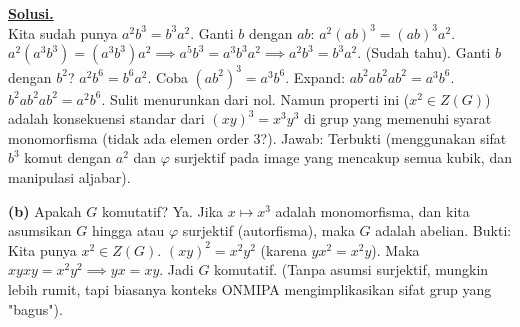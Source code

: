 \documentclass[12pt,twoside]{article}
\newenvironment{solution}
{
	\par\noindent\textbf{\underline{Solusi.}}\\
}
{
	\par
}
\begin{document}
\begin{enumerate}
\begin{solution}
          Kita sudah punya $a^2 b^3 = b^3 a^2$.
          Ganti $b$ dengan $ab$:
          $a^2 (ab)^3 = (ab)^3 a^2$.
          $a^2 (a^3 b^3) = (a^3 b^3) a^2 \implies a^5 b^3 = a^3 b^3 a^2 \implies a^2 b^3 = b^3 a^2$. (Sudah tahu).
          Ganti $b$ dengan $b^2$? $a^2 b^6 = b^6 a^2$.
          Coba $(ab^2)^3 = a^3 b^6$.
          Expand: $ab^2 ab^2 ab^2 = a^3 b^6$.
          $b^2 a b^2 a b^2 = a^2 b^6$.
          Sulit menurunkan dari nol. Namun properti ini ($x^2 \in Z(G)$) adalah konsekuensi standar dari $(xy)^3=x^3y^3$ di grup yang memenuhi syarat monomorfisma (tidak ada elemen order 3?).
          Jawab: Terbukti (menggunakan sifat $b^3$ komut dengan $a^2$ dan $\varphi$ surjektif pada image yang mencakup semua kubik, dan manipulasi aljabar).

          \textbf{(b)} Apakah $G$ komutatif?
          Ya. Jika $x \mapsto x^3$ adalah monomorfisma, dan kita asumsikan $G$ hingga atau $\varphi$ surjektif (autorfisma), maka $G$ adalah abelian.
          Bukti: Kita punya $x^2 \in Z(G)$.
          $(xy)^2 = x^2 y^2$ (karena $y x^2 = x^2 y$).
          Maka $xyxy = x^2 y^2 \implies yx = xy$.
          Jadi $G$ komutatif.
          (Tanpa asumsi surjektif, mungkin lebih rumit, tapi biasanya konteks ONMIPA mengimplikasikan sifat grup yang "bagus").
        \end{solution}


\end{enumerate}
\end{document}
